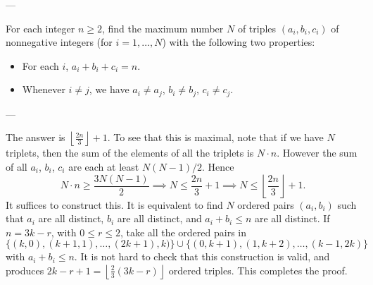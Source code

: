 
---

For each integer $n\ge2$, find the maximum number $N$ of triples $(a_i,b_i,c_i)$ of nonnegative integers (for $i=1,\ldots,N$) with the following two properties:
\begin{itemize}[itemsep=0em]
    \item For each $i$, $a_i+b_i+c_i=n$.
    \item Whenever $i\ne j$, we have $a_i\ne a_j$, $b_i\ne b_j$, $c_i\ne c_j$.
\end{itemize}

---

The answer is $\left\lfloor\frac{2n}3\right\rfloor+1$. To see that this is maximal, note that if we have $N$ triplets, then the sum of the elements of all the triplets is $N\cdot n$. However the sum of all $a_i$, $b_i$, $c_i$ are each at least $N(N-1)/2$. Hence \[N\cdot n\ge\frac{3N(N-1)}2\implies N\le\frac{2n}3+1\implies N\le\left\lfloor\frac{2n}3\right\rfloor+1.\]
It suffices to construct this. It is equivalent to find $N$ ordered pairs $(a_i,b_i)$ such that $a_i$ are all distinct, $b_i$ are all distinct, and $a_i+b_i\le n$ are all distinct. If $n=3k-r$, with $0\le r\le2$, take all the ordered pairs in $\{(k,0),(k+1,1),\ldots,(2k+1),k)\}\cup\{(0,k+1),(1,k+2),\ldots,(k-1,2k)\}$ with $a_i+b_i\le n$. It is not hard to check that this construction is valid, and produces $2k-r+1=\left\lfloor\frac23(3k-r)\right\rfloor$ ordered triples. This completes the proof.
